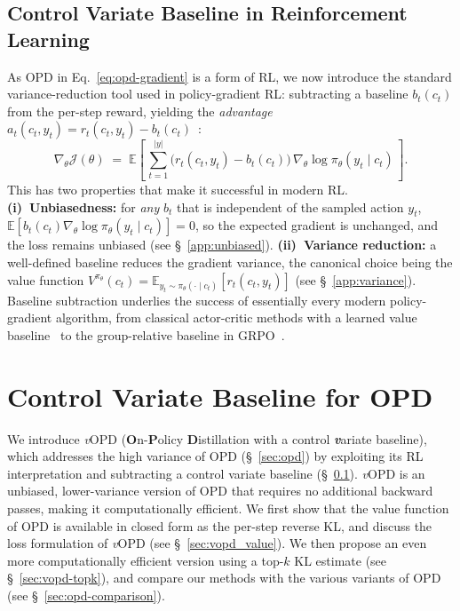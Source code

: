 \documentclass{article}
\newcommand{\method}{\emph{v}OPD}
\begin{document}
\subsection{Control Variate Baseline in Reinforcement Learning}
\label{sec:baseline}
As OPD in Eq.~\eqref{eq:opd-gradient} is a form of RL, we now introduce the standard variance-reduction tool used in policy-gradient RL: subtracting a baseline $b_t(c_t)$ from the per-step reward, yielding the \emph{advantage} $a_t(c_t,y_t) = r_t(c_t,y_t) - b_t(c_t)$~\citep{williams1992simple,sutton1999policygrad}:
\begin{equation}
\label{eq:baseline-grad}
\nabla_\theta \mathcal{J}(\theta)
\;=\;
\mathbb{E}\!\left[\, \sum_{t=1}^{|y|} \bigl(r_t(c_t,y_t) - b_t(c_t)\bigr)\,\nabla_\theta\log \pi_\theta(y_t\mid c_t) \,\right].
\end{equation}
This has two properties that make it successful in modern RL. \textbf{(i)~Unbiasedness:} for \emph{any} $b_t$ that is independent of the sampled action $y_t$, $\mathbb{E}[b_t(c_t)\nabla_\theta\log\pi_\theta(y_t\mid c_t)] = 0$, so the expected gradient is unchanged, and the loss remains unbiased (see \S~\ref{app:unbiased}). \textbf{(ii)~Variance reduction:} a well-defined baseline reduces the gradient variance, the canonical choice being the value function $V^{\pi_\theta}(c_t) = \mathbb{E}_{y_t \sim \pi_\theta(\cdot\mid c_t)}[r_t(c_t,y_t)]$ (see \S~\ref{app:variance}). Baseline subtraction underlies the success of essentially every modern policy-gradient algorithm, from classical actor-critic methods with a learned value baseline~\citep{mnih2016asynchronous, schulman2017ppo,schulman2016high} to the group-relative baseline in GRPO~\citep{shao2024deepseekmath}.

\section{Control Variate Baseline for OPD}
\label{sec:method}
We introduce \method{} (\textbf{O}n-\textbf{P}olicy \textbf{D}istillation with a control \emph{\textbf{v}}ariate baseline), which addresses the high variance of OPD (\S~\ref{sec:opd}) by exploiting its RL interpretation and subtracting a control variate baseline (\S~\ref{sec:baseline}). \method{} is an unbiased, lower-variance version of OPD that requires no additional backward passes, making it computationally efficient. We first show that the value function of OPD is available in closed form as the per-step reverse KL, and discuss the loss formulation of \method{} (see \S~\ref{sec:vopd_value}). We then propose an even more computationally efficient version using a top-$k$ KL estimate (see \S~\ref{sec:vopd-topk}), and compare our methods with the various variants of OPD (see \S~\ref{sec:opd-comparison}).
\end{document}
